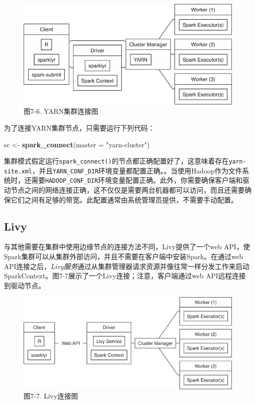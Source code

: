 \documentclass[
]{article}
\newenvironment{Shaded}{\begin{snugshade}}{\end{snugshade}}
\newcommand{\DataTypeTok}[1]{\textcolor[rgb]{0.13,0.29,0.53}{#1}}
\newcommand{\KeywordTok}[1]{\textcolor[rgb]{0.13,0.29,0.53}{\textbf{#1}}}
\newcommand{\NormalTok}[1]{#1}
\newcommand{\StringTok}[1]{\textcolor[rgb]{0.31,0.60,0.02}{#1}}
\begin{document}
\begin{figure}
\centering
\includegraphics{figures/7_6.png}
\caption{图7-6. YARN集群连接图}
\end{figure}

为了连接YARN集群节点，只需要运行下列代码：

\begin{Shaded}
\begin{Highlighting}[]
\NormalTok{sc <-}\StringTok{ }\KeywordTok{spark_connect}\NormalTok{(}\DataTypeTok{master =} \StringTok{"yarn-cluster"}\NormalTok{)}
\end{Highlighting}
\end{Shaded}

集群模式假定运行\texttt{spark\_connect()}的节点都正确配置好了，这意味着存在\texttt{yarn-site.xml}，并且\texttt{YARN\_CONF\_DIR}环境变量都配置正确。。当使用Hadoop作为文件系统时，还需要\texttt{HADOOP\_CONF\_DIR}环境变量配置正确。此外，你需要确保客户端和驱动节点之间的网络连接正确，这不仅仅是需要两台机器都可以访问，而且还需要确保它们之间有足够的带宽。此配置通常由系统管理员提供，不需要手动配置。

\hypertarget{livy-1}{%
\subsection{Livy}\label{livy-1}}

与其他需要在集群中使用边缘节点的连接方法不同，Livy提供了一个web
API，使Spark集群可以从集群外部访问，并且不需要在客户端中安装Spark。在通过web
API连接之后，\emph{Livy服务}通过从集群管理器请求资源并像往常一样分发工作来启动SparkContext。图7-7展示了一个Livy连接；注意，客户端通过web
API远程连接到驱动节点。

\begin{figure}
\centering
\includegraphics{figures/7_7.png}
\caption{图7-7. Livy连接图}
\end{figure}
\end{document}
